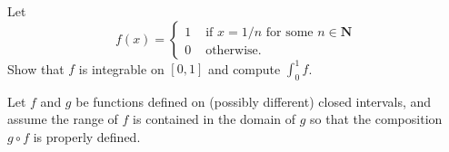 \begin{exercise} Let
$$
f(x)= \begin{cases}1 & \text { if } x=1 / n \text { for some } n \in \mathbf{N} \\ 0 & \text { otherwise. }\end{cases}
$$
Show that $f$ is integrable on $[0,1]$ and compute $\int_{0}^{1} f$.
\end{exercise}
\begin{solution}
    \TODO
\end{solution}

\begin{exercise} Let $f$ and $g$ be functions defined on (possibly different) closed intervals, and assume the range of $f$ is contained in the domain of $g$ so that the composition $g \circ f$ is properly defined.
\end{exercise}
